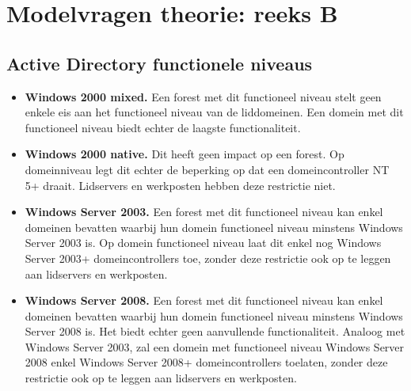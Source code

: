 \chapter{Modelvragen theorie: reeks B}
	\section{Active Directory functionele niveaus }
	\begin{enumerate}
		 {
			\begin{itemize}
				\item \textbf{Windows 2000 mixed.} Een forest met dit functioneel niveau stelt geen enkele eis aan het functioneel niveau van de liddomeinen. Een domein met dit functioneel niveau biedt echter de laagste functionaliteit. 
				\item \textbf{Windows 2000 native.} Dit heeft geen impact op een forest. Op domeinniveau legt dit echter de beperking op dat een domeincontroller NT 5+ draait. Lidservers en werkposten hebben deze restrictie niet.
				\item \textbf{Windows Server 2003.} Een forest met dit functioneel niveau kan enkel domeinen bevatten waarbij hun domein functioneel niveau minstens Windows Server 2003 is. Op domein functioneel niveau laat dit enkel nog Windows Server 2003+ domeincontrollers toe, zonder deze restrictie ook op te leggen aan lidservers en werkposten. 
				\item \textbf{Windows Server 2008.} Een forest met dit functioneel niveau kan enkel domeinen bevatten waarbij hun domein functioneel niveau minstens Windows Server 2008 is. Het biedt echter geen aanvullende functionaliteit. Analoog met Windows Server 2003, zal een domein met functioneel niveau Windows Server 2008 enkel Windows Server 2008+ domeincontrollers toelaten, zonder deze restrictie ook op te leggen aan lidservers en werkposten. 
			\end{itemize}
			
}
\end{enumerate}
